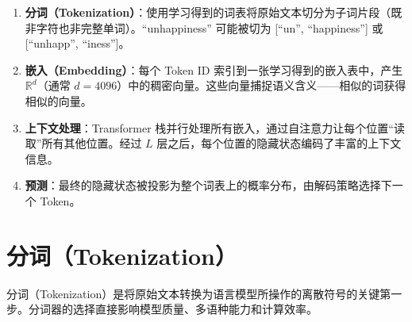\begin{keybox}[四个关键阶段]
\begin{enumerate}
  \item \textbf{分词（Tokenization）}：使用学习得到的词表将原始文本切分为子词片段（既非字符也非完整单词）。``unhappiness'' 可能被切为 [``un'', ``happiness''] 或 [``unhapp'', ``iness'']。
  \item \textbf{嵌入（Embedding）}：每个 Token ID 索引到一张学习得到的嵌入表中，产生 $\mathbb{R}^d$（通常 $d = 4096$）中的稠密向量。这些向量捕捉语义含义——相似的词获得相似的向量。
  \item \textbf{上下文处理}：Transformer 栈并行处理所有嵌入，通过自注意力让每个位置``读取''所有其他位置。经过 $L$ 层之后，每个位置的隐藏状态编码了丰富的上下文信息。
  \item \textbf{预测}：最终的隐藏状态被投影为整个词表上的概率分布，由解码策略选择下一个 Token。
\end{enumerate}
\end{keybox}

\section{分词（Tokenization）}
\label{sec:tokenization}

分词（Tokenization）是将原始文本转换为语言模型所操作的离散符号的关键第一步。分词器的选择直接影响模型质量、多语种能力和计算效率。

